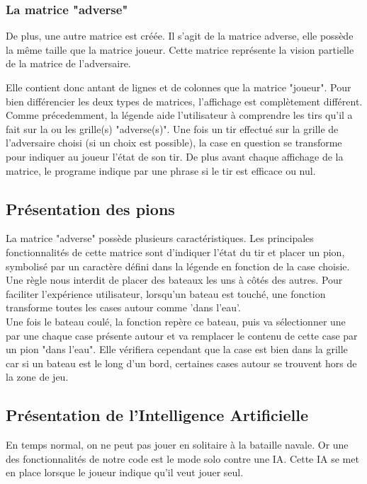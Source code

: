 \documentclass[a4paper,12pt]{article}
\begin{document}
        \subsubsection{La matrice "adverse"}
            De plus, une autre matrice est créée. Il s'agit de la matrice adverse, elle possède la même taille que la matrice joueur. Cette matrice représente la vision partielle de la matrice de l'adversaire.
            
            Elle contient donc antant de lignes et de colonnes que la matrice "joueur". Pour bien différencier les deux types de matrices, l'affichage est complètement différent. Comme précedemment, la légende aide l'utilisateur à comprendre les tirs qu'il a fait sur la ou les grille(s) "adverse(s)". Une fois un tir effectué sur la grille de l'adversaire choisi (si un choix est possible), la case en question se transforme pour indiquer au joueur l'état de son tir. De plus avant chaque affichage de la matrice, le programe indique par une phrase si le tir est efficace ou nul. \\   
    
\subsection {Présentation des pions}
    La matrice "adverse" possède plusieurs caractéristiques. Les principales fonctionnalités de cette matrice sont d'indiquer l'état du tir et placer un pion, symbolisé par un caractère défini dans la légende en fonction de la case choisie. 
    \vspace{2\baselineskip}\\
    Une règle nous interdit de placer des bateaux les uns à côtés des autres. Pour faciliter l'expérience utilisateur, lorsqu'un bateau est touché, une fonction transforme toutes les cases autour comme 'dans l'eau'.
    \vspace{2\baselineskip}\\
    Une fois le bateau coulé, la fonction repère ce bateau, puis va sélectionner une par une chaque case présente autour et va remplacer le contenu de cette case par un pion "dans l'eau". Elle vérifiera cependant que la case est bien dans la grille car si un bateau est le long d'un bord, certaines cases autour se trouvent hors de la zone de jeu. \\ 
\newpage
\subsection {Présentation de l'Intelligence Artificielle}
    En temps normal, on ne peut pas jouer en solitaire à la bataille navale. Or une des fonctionnalités de notre code est le mode solo contre une IA. Cette IA se met en place lorsque le joueur indique qu'il veut jouer seul. 
\end{document}
